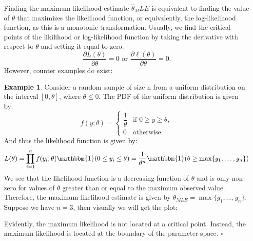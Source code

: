 \documentclass{article}
\theoremstyle{definition}
\newtheorem{example}[theorem]{Example}
\theoremstyle{remark}
\begin{document}
Finding the maximum likelihood estimate $\hat{\theta}_MLE$ is equivalent to finding the value of $\theta$ that maximizes the likelihood function, or equivalently, the log-likelihood function, as this is a monotonic transformation. Usually, we find the critical points of the likilihood or log-likelihood function by taking the derivative with respect to $\theta$ and setting it equal to zero:
\begin{equation}
 \dfrac{\partial L(\theta)}{\partial \theta} = 0\text{ or }\dfrac{\partial \ell(\theta)}{\partial \theta} = 0.
\end{equation}
However, counter examples do exist:
\begin{example}
    Consider a random sample of size n from a uniform distribution on the interval $[0, \theta]$, where $\theta \leq 0$. The PDF of the uniform distribution is given by:
    \begin{equation}
        f(y; \theta) = \begin{cases}
            \dfrac{1}{\theta} & \text{if } 0 \geq y \geq \theta, \\
            0 & \text{otherwise}.
        \end{cases}
        \end{equation}
    And thus the likelihood function is given by:
\begin{equation}
    L(\theta) = \prod_{i=1}^{n} f(y_i; \theta) \mathbbm{1}(0 \leq y_i \leq \theta) = \dfrac{1}{\theta^n} \mathbbm{1}(\theta \geq \max\{y_1, \ldots, y_n\})
\end{equation}
We see that the likelihood function is a decreasing function of $\theta$ and is only non-zero for values of $\theta$ greater than or equal to the maximum observed value. Therefore, the maximum likelihood estimate is given by $\hat{\theta}_{MLE} = \max\{y_1, \ldots, y_n\}$.
Suppose we have $n = 3$, then visually we will get the plot:
\begin{figure}[H]
    \centering

    \label{fig:likelihood_uniform}
\end{figure}
Evidently, the maximum likelihood is not located at a critical point. Instead, the maximum likelihood is located at the boundary of the parameter space.
$\square$
\end{example}
\end{document}

